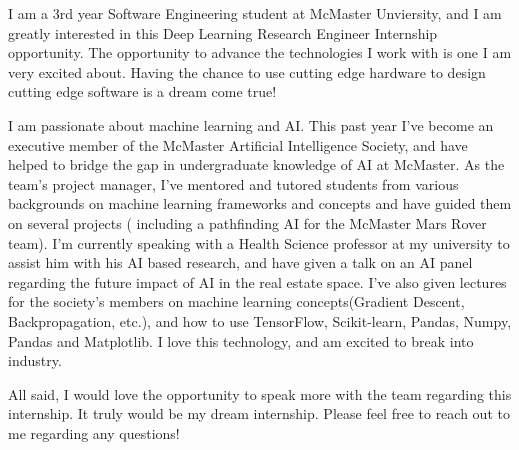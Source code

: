 \documentclass[11pt, letterpaper]{awesome-cv}
\begin{document}
\makecvheader[R]


\makelettertitle

\begin{cvletter}

I am a 3rd year Software Engineering student at McMaster Unviersity, and I am greatly interested in this  
Deep Learning Research Engineer Internship opportunity. The opportunity to advance the technologies I work with is one I am very excited about. Having the chance to use cutting edge hardware to design cutting edge software is a dream come true!

 I am passionate about machine learning and AI. This past year I've become an executive member of the McMaster Artificial Intelligence Society, and have helped to bridge the gap in undergraduate knowledge of AI at McMaster. As the team's project manager, I've mentored and tutored students from various backgrounds on machine learning frameworks and concepts and have guided them on several projects ( including a pathfinding AI for the McMaster Mars Rover team).  I'm currently speaking with a Health Science professor at my university to assist him with his AI based research, and have given a talk on an AI panel regarding the future impact of AI in the real estate space. I've also given lectures for the society's members on machine learning concepts(Gradient Descent, Backpropagation, etc.), and how to use TensorFlow, Scikit-learn, Pandas, Numpy, Pandas and Matplotlib. I love this technology, and am excited to break into industry. 


All said, I would love the opportunity to speak more with the team regarding this internship. It truly would be my dream internship. Please feel free to reach out to me regarding any questions!


\end{cvletter}



\makeletterclosing
\end{document}
